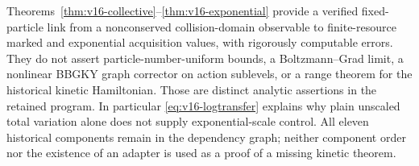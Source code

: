\begin{remark}
Theorems~\ref{thm:v16-collective}--\ref{thm:v16-exponential} provide a
verified fixed-particle link from a nonconserved collision-domain
observable to finite-resource marked and exponential acquisition
values, with rigorously computable errors. They do not assert
particle-number-uniform bounds, a Boltzmann--Grad limit, a nonlinear
BBGKY graph corrector on action sublevels, or a range theorem for the
historical kinetic Hamiltonian. Those are distinct analytic assertions
in the retained program. In particular \eqref{eq:v16-logtransfer}
explains why plain unscaled total variation alone does not supply
exponential-scale control. All eleven historical components remain in
the dependency graph; neither component order nor the existence of an
adapter is used as a proof of a missing kinetic theorem.
\end{remark}
